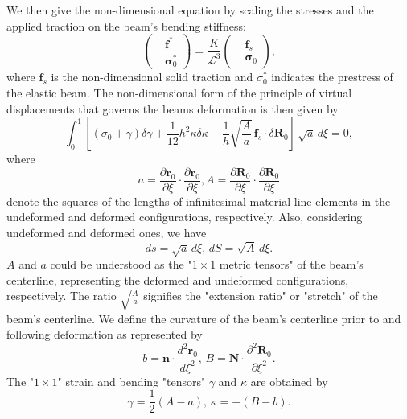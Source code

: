 \documentclass[lineno]{JFM-FLM_Au}
\begin{document}
We then give the non-dimensional equation by scaling the stresses and the applied traction on the beam's bending stiffness:
\begin{equation}
	\label{eqn:30}
	\left(\begin{aligned}
		&\mathbf{f^*} \\
		&\mathbf{\sigma}_0^*
	\end{aligned}\right)
	=\frac{K}{\mathcal{L}^3}\left(\begin{aligned}
		&\mathbf{f}_{s} \\
		&\mathbf{\sigma}_0
	\end{aligned}\right),
\end{equation}
where $\mathbf{f}_{s}$ is the non-dimensional solid traction and $\sigma^*_0$ indicates the prestress of the elastic beam.
The non-dimensional form of the principle of virtual displacements that governs the beams deformation is then given by
\begin{equation}
	\label{eqn:31}
	\int^1_0 \left[(\sigma_0+\gamma)\delta\gamma+\frac{1}{12}h^2\kappa\delta\kappa-\frac{1}{h}\sqrt{\frac{A}{a}}\,\mathbf{f}_{s}\cdot \delta \mathbf{R}_0
	\right]\,\sqrt{a}\,d\xi=0,
\end{equation}
where 
\begin{equation}
	\label{eqn:32} a=\frac{\partial\mathbf{r}_0}{\partial\xi}\cdot\frac{\partial\mathbf{r}_0}{\partial\xi}, A=\frac{\partial\mathbf{R}_0}{\partial\xi}\cdot\frac{\partial\mathbf{R}_0}{\partial\xi}
\end{equation}
denote the squares of the lengths of infinitesimal material line elements in the undeformed and deformed configurations, respectively.
Also, considering undeformed and deformed ones, we have 
\begin{equation}
	\label{eqn:33}
	ds=\sqrt{a}\,d\xi,\,dS=\sqrt{A}\,d\xi.
\end{equation}
$A$ and $a$ could be understood as the "$1\times1$ metric tensors" of the beam's centerline, representing the deformed and undeformed configurations, respectively. 
The ratio $\sqrt{\frac{A}{a}}$ signifies the "extension ratio" or "stretch" of the beam's centerline. We define the curvature of the beam's centerline prior to and following deformation as represented by 
\begin{equation}
	\label{eqn:34}
	b=\mathbf{n}\cdot\frac{d^2\mathbf{r}_0}{d\xi^2},\,B=\mathbf{N}\cdot\frac{\partial^2\mathbf{R}_0}{\partial\xi^2}.
\end{equation}
The "$1\times1$" strain and bending "tensors" $\gamma$ and $\kappa$ are obtained by
\begin{equation}
	\label{eqn:35}
	\gamma=\frac{1}{2}(A-a),\,\kappa=-(B-b).
\end{equation}
\end{document}
